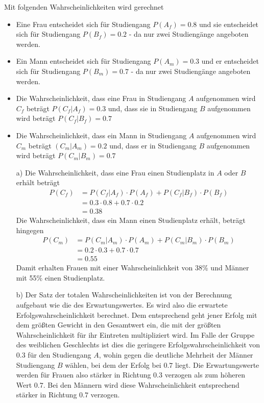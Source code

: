 Mit folgenden Wahrscheinlichkeiten wird gerechnet
\begin{itemize}
	\item Eine Frau entscheidet sich für Studiengang $P(A_f) = 0.8$ und sie entscheidet sich für Studiengang $P(B_f) = 0.2$ - da nur zwei Studiengänge angeboten werden.
	\item Ein Mann entscheidet sich für Studiengang $P(A_m) = 0.3$ und er entscheidet sich für Studiengang $P(B_m) = 0.7$ - da nur zwei Studiengänge angeboten werden.
	\item Die Wahrscheinlichkeit, dass eine Frau in Studiengang $A$ aufgenommen wird $C_f$ beträgt $P(C_f|A_f) = 0.3$ und, dass sie in Studiengang $B$ aufgenommen wird beträgt $P(C_f|B_f) = 0.7$
	\item Die Wahrscheinlichkeit, dass ein Mann in Studiengang $A$ aufgenommen wird $C_m$ beträgt $(C_m|A_m) = 0.2$ und, dass er in Studiengang $B$ aufgenommen wird beträgt $P(C_m|B_m) = 0.7$ 
\end{itemize}
\begin{enumerate}
	\item[a)]
		Die Wahrscheinlichkeit, dass eine Frau einen Studienplatz in $A$ oder $B$ erhält beträgt
		\begin{equation*}
			\begin{split}
				P(C_f) 	&= P(C_f|A_f) \cdot P(A_f) + P(C_f|B_f) \cdot P(B_f)\\
						&= 0.3 \cdot 0.8 + 0.7 \cdot 0.2\\
						&= 0.38
			\end{split}
		\end{equation*}
		Die Wahrscheinlichkeit, dass ein Mann einen Studienplatz erhält, beträgt hingegen
		\begin{equation*}
			\begin{split}
				P(C_m)	&= P(C_m|A_m) \cdot P(A_m) + P(C_m|B_m) \cdot P(B_m)\\
						&= 0.2 \cdot 0.3 + 0.7 \cdot 0.7\\
						&= 0.55
			\end{split}
		\end{equation*}
		Damit erhalten Frauen mit einer Wahrscheinlichkeit von 38\% und Männer mit 55\% einen Studienplatz.
	\item[b)] Der Satz der totalen Wahrscheinlichkeiten ist von der Berechnung aufgebaut wie die des Erwartungswertes. Es wird also die erwartete Erfolgswahrscheinlichkeit berechnet. Dem entsprechend geht jener Erfolg mit dem größten Gewicht in den Gesamtwert ein, die mit der größten Wahrscheinlichkeit für ihr Eintreten multipliziert wird.
	Im Falle der Gruppe des weiblichen Geschlechts ist dies die geringere Erfolgswahrscheinlichkeit von $0.3$ für den Studiengang $A$, wohin gegen die deutliche Mehrheit der Männer Studiengang $B$ wählen, bei dem der Erfolg bei $0.7$ liegt. Die Erwartungswerte werden für Frauen also stärker in Richtung $0.3$ verzogen als zum höheren Wert $0.7$. Bei den Männern wird diese Wahrscheinlichkeit entsprechend stärker in Richtung $0.7$ verzogen. 
\end{enumerate}